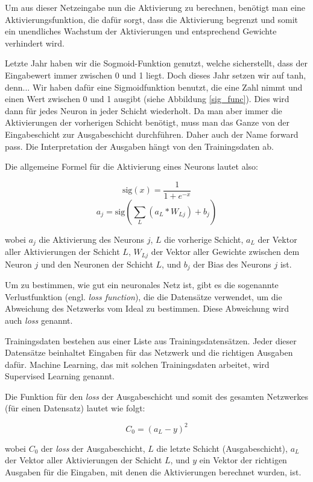 \documentclass[10pt]{article}
\newcommand{\sig}{\textrm{sig}}
\newcommand{\threesub}[1]{
    \vspace{1.5ex}
    \noindent {\textbf{#1}}
    \vspace{0.5ex}
}
\newcommand{\form}[1]{#1}
\newcommand{\eng}[1]{\textit{#1}}
\newcommand{\feng}[1]{{#1}}
\begin{document}
Um aus dieser Netzeingabe nun die Aktivierung zu berechnen, benötigt man eine Aktivierungsfunktion, die dafür sorgt, dass die Aktivierung begrenzt und somit ein unendliches Wachstum der Aktivierungen und entsprechend Gewichte verhindert wird.

Letzte Jahr haben wir die Sogmoid-Funktion genutzt, welche sicherstellt, dass der Eingabewert immer zwischen 0 und 1 liegt.
Doch dieses Jahr setzen wir auf tanh, denn...
Wir haben dafür eine Sigmoidfunktion benutzt, die eine Zahl nimmt und einen Wert zwischen 0 und 1 ausgibt (siehe Abbildung \ref{sig_func}). 
Dies wird dann für jedes Neuron in jeder Schicht wiederholt. Da man aber immer die Aktivierungen der vorherigen Schicht benötigt, muss man das Ganze von der Eingabeschicht zur Ausgabeschicht durchführen. Daher auch der Name \feng{forward pass}. Die Interpretation der Ausgaben hängt von den Trainingsdaten ab.
	
Die allgemeine Formel für die Aktivierung eines Neurons lautet also:


\form{
\[
	\sig(x)=\frac{1}{1+e^{-x}}
	\]
\[
	a_{j} = \sig\left(\sum_{L} (a_{L} * W_{Lj}) + b_{j}\right)
	\]}
	
\noindent wobei $a_j$ die Aktivierung des Neurons $j$, $L$ die vorherige Schicht, $a_L$ der Vektor aller Aktivierungen der Schicht $L$, $W_{Lj}$ der Vektor aller Gewichte zwischen dem Neuron $j$ und den Neuronen der Schicht $L$, und $b_j$ der Bias des Neurons $j$ ist. \cite{brotcrunsher:forwardpass}	
	
\threesub{Loss} 

Um zu bestimmen, wie gut ein neuronales Netz ist, gibt es die sogenannte Verlustfunktion (engl. \eng{loss function}), die die Datensätze verwendet, um die Abweichung des Netzwerks vom Ideal zu bestimmen. Diese Abweichung wird auch \eng{loss} genannt.

Trainingsdaten bestehen aus einer Liste aus Trainingsdatensätzen. Jeder dieser Datensätze beinhaltet Eingaben für das Netzwerk und die richtigen Ausgaben dafür. Machine Learning, das mit solchen Trainingsdaten arbeitet, wird Supervised Learning genannt.

Die Funktion für den \eng{loss} der Ausgabeschicht und somit des gesamten Netzwerkes (für einen Datensatz) lautet wie folgt:

\form{ \[
	C_0 = (a_L - y)^2
\]}


\noindent wobei $C_0$ der \eng{loss} der Ausgabeschicht, $L$ die letzte Schicht (Ausgabeschicht), $a_L$ der Vektor aller Aktivierungen der Schicht $L$, und $y$ ein Vektor der richtigen Ausgaben für die Eingaben, mit denen die Aktivierungen berechnet wurden, ist. 
	
\end{document}
